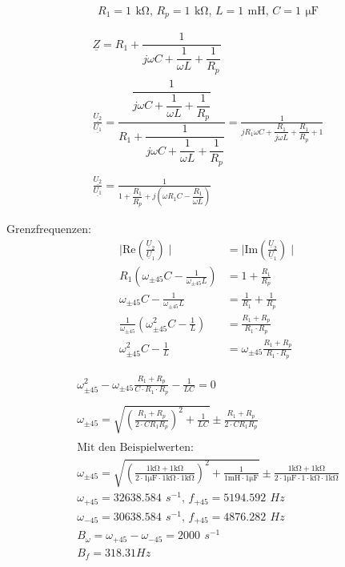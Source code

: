 \documentclass[a4paper, 12pt]{article}
\begin{document}
  $$ R_1 = 1 \,\ \si{\kilo\ohm} \text{, } R_p = 1 \,\ \si{\kilo\ohm} \text{, }  L = 1 \,\ \si{\milli\henry} \text{, }  C = 1 \,\ \si{\micro\farad}$$

  \begin{gather*}
    \underline{Z} = R_1 + \dfrac{1}{j \omega C + \dfrac{1}{\omega L} + \dfrac{1}{R_p}}\\
    \frac{\underline{U_2}}{\underline{U_1}} = \dfrac{\dfrac{1}{j \omega C + \dfrac{1}{\omega L} + \dfrac{1}{R_p}}}{R_1 + \dfrac{1}{j \omega C + \dfrac{1}{\omega L} + \dfrac{1}{R_p}}} = \frac{1}{j R_1 \omega C + \dfrac{R_1}{j \omega L} + \dfrac{R_1}{R_p} + 1}\\\\
    \frac{\underline{U_2}}{\underline{U_1}} = \frac{1}{1+ \dfrac{R_1}{R_p} + j \left (\omega R_1 C - \dfrac{R_1}{\omega L} \right)}
  \end{gather*}

  Grenzfrequenzen:
    \begin{align*}
      \mid \text{Re}\left( \frac{ \underline{U}_2 }{ \underline{U}_1 } \right) \mid &= \mid \text{Im}\left( \frac{ \underline{U}_2 }{ \underline{U}_1 } \right) \mid\\
      R_1 \left(\omega_{\pm 45} C - \frac{1}{\omega_{\pm 45} L} \right) &= 1 + \frac{R_1}{R_p}\\
      \omega_{\pm 45} C - \frac{1}{\omega_{\pm 45} L} &= \frac{1}{R_1} + \frac{1}{R_p}\\
      \frac{1}{\omega_{\pm 45}}\left( \omega_{\pm 45}^2 C - \frac{1}{L} \right) &= \frac{R_1+R_p}{R_1 \cdot R_p}\\
      \omega_{\pm 45}^2 C - \frac{1}{L} &= \omega_{\pm 45} \frac{R_1+R_p}{R_1 \cdot R_p}
    \end{align*}

    \begin{gather*}
      \omega_{\pm 45}^2 - \omega_{\pm 45} \frac{R_1+R_p}{C \cdot R_1 \cdot R_p} - \frac{1}{LC} = 0\\\\
      \omega_{\pm 45} = \sqrt{\left( \frac{R_1 + R_p}{2 \cdot C R_1 R_p}\right)^2 + \frac{1}{LC}} \pm \frac{R_1+R_p}{2\cdot C R_1 R_p}\\\\
      \text{Mit den Beispielwerten:}\\
      \omega_{\pm 45} = \sqrt{\left( \frac{1 \si{\kilo\ohm} + 1 \si{\kilo\ohm}}{2 \cdot 1 \si{\micro\farad} \cdot 1 \si{\kilo\ohm} \cdot 1 \si{\kilo\ohm}}\right)^2 + \frac{1}{1 \si{\milli\henry} \cdot 1 \si{\micro\farad}}} \pm \frac{1 \si{\kilo\ohm}+1 \si{\kilo\ohm}}{2\cdot 1 \si{\micro\farad} \cdot 1 \cdot \si{\kilo\ohm} \cdot 1 \si{\kilo\ohm}}\\
      \omega_{+45} = 32638.584 \,\ \si{s}^{-1} \text{, } f_{+45} = 5194.592 \,\ \si{Hz}\\
      \omega_{-45} = 30638.584 \,\ \si{s}^{-1} \text{, } f_{+45} = 4876.282 \,\ \si{Hz}\\
      B_{\omega}   = \omega_{+45} - \omega_{-45} = 2000 \,\ \si{s}^{-1}\\
      B_{f}        = 318.31 \si{Hz}
    \end{gather*}
\end{document}
